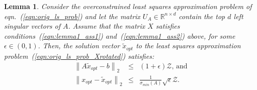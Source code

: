 \documentclass[11pt]{article}
\newcommand{\VTTNorm }[1]{\mbox{}\left\|#1\right\|_2  }
\newtheorem{lemma}{Lemma}
\begin{document}
\begin{lemma} \label{lem:suff_cond}
Consider the overconstrained least squares approximation problem of eqn.~(\ref{eqn:orig_ls_prob}) and let the matrix $U_A \in \mathbb{R}^{n \times d}$ contain the top $d$ left singular vectors of $A$. Assume that the matrix $X$ satisfies conditions~(\ref{eqn:lemma1_ass1}) and~(\ref{eqn:lemma1_ass2}) above, for some $\epsilon \in (0,1)$. Then, the solution vector $\tilde{x}_{opt}$ to the least squares approximation
problem~(\ref{eqn:orig_ls_prob_Xrotated}) satisfies:
\begin{eqnarray}
\label{eqn:lemma1_eq3}
\VTTNorm{A\tilde{x}_{opt}-b} &\le& (1+\epsilon) \mathcal{Z}  \mbox{, and}  \\
\label{eqn:lemma1_eq4}
\VTTNorm{x_{opt}-\tilde{x}_{opt}}
  &\leq& \frac{1}{\sigma_{min}(A)}\sqrt{\epsilon}\mathcal{Z}  .
\end{eqnarray}
\end{lemma}
\end{document}
